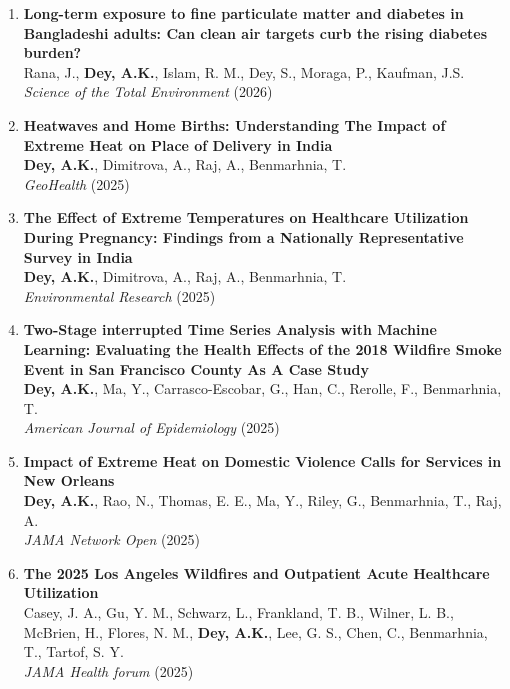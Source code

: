 \documentclass[11pt,letterpaper]{article}
\begin{document}
\begin{enumerate}
\item \textbf{Long-term exposure to fine particulate matter and diabetes in Bangladeshi adults: Can clean air targets curb the rising diabetes burden?}\\
Rana, J., \textbf{Dey, A.K.}, Islam, R. M., Dey, S., Moraga, P., Kaufman, J.S. \\
\emph{Science of the Total Environment} (2026) 

\item \textbf{Heatwaves and Home Births: Understanding The Impact of Extreme Heat on Place of Delivery in India}\\
\textbf{Dey, A.K.}, Dimitrova, A., Raj, A., Benmarhnia, T.\\
\emph{GeoHealth} (2025) 

\item \textbf{The Effect of Extreme Temperatures on Healthcare Utilization During Pregnancy: Findings from a Nationally Representative Survey in India}\\
\textbf{Dey, A.K.}, Dimitrova, A., Raj, A., Benmarhnia, T.\\
\emph{Environmental Research} (2025) 

\item \textbf{Two-Stage interrupted Time Series Analysis with Machine Learning: Evaluating the Health Effects of the 2018 Wildfire Smoke Event in San Francisco County As A Case Study}\\
\textbf{Dey, A.K.}, Ma, Y., Carrasco-Escobar, G., Han, C., Rerolle, F., Benmarhnia, T.\\
\emph{American Journal of Epidemiology} (2025) 

\item \textbf{Impact of Extreme Heat on Domestic Violence Calls for Services in New Orleans}\\
\textbf{Dey, A.K.}, Rao, N., Thomas, E. E., Ma, Y., Riley, G., Benmarhnia, T., Raj, A.\\
\emph{JAMA Network Open} (2025) 

\item \textbf{The 2025 Los Angeles Wildfires and Outpatient Acute Healthcare Utilization}\\
Casey, J. A., Gu, Y. M., Schwarz, L., Frankland, T. B., Wilner, L. B., McBrien, H., Flores, N. M., \textbf{Dey, A.K.}, Lee, G. S., Chen, C., Benmarhnia, T., Tartof, S. Y.\\
\emph{JAMA Health forum}  (2025) 


\end{enumerate}
\end{document}
